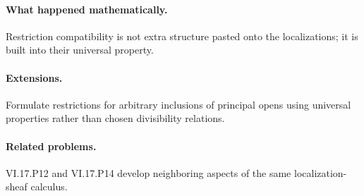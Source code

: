 \paragraph{What happened mathematically.}
Restriction compatibility is not extra structure pasted onto the localizations; it is built into their universal property.

\paragraph{Extensions.}
Formulate restrictions for arbitrary inclusions of principal opens using universal properties rather than chosen divisibility relations.

\paragraph{Related problems.}
VI.17.P12 and VI.17.P14 develop neighboring aspects of the same localization-sheaf calculus.
\fi
